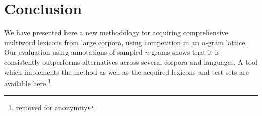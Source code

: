 \documentclass[11pt,letterpaper]{article}
\begin{document}
\section{Conclusion}

We have presented here a new methodology for acquiring comprehensive multiword lexicons from large corpora, using competition in an $n$-gram lattice. Our evaluation using annotations of sampled $n$-grams shows that it is consistently outperforms alternatives across several corpora and languages. A tool which implements the method as well as the acquired lexicons and test sets are available here.\footnote{removed for anonymity} 




\end{document}
